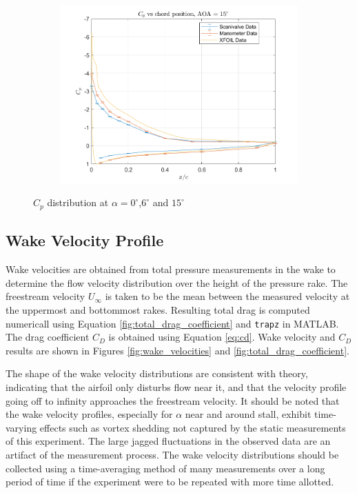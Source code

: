 \documentclass[runningheads]{llncs}
\begin{document}
\begin{figure}[h]
\begin{subfigure}[b]{0.45\textwidth}
         \includegraphics[width=\textwidth]{figures/AOA15.png}
         \caption{}
         \label{fig:cp_6}
     \end{subfigure}
    \caption{$C_p$ distribution at $\alpha = 0^\circ$,$6^\circ$ and $15^\circ$}
    \label{fig:cp}
\end{figure}


\subsection{Wake Velocity Profile}
Wake velocities are obtained from total pressure measurements in the wake to determine the flow velocity distribution over the height of the pressure rake. The freestream velocity $U_\infty$ is taken to be the mean between the measured velocity at the uppermost and bottommost rakes. Resulting total drag is computed numericall using Equation \ref{fig:total_drag_coefficient} and \verb|trapz| in MATLAB. The drag coefficient $C_D$ is obtained using Equation \ref{eq:cd}. Wake velocity and $C_D$ results are shown in Figures \ref{fig:wake_velocities} and \ref{fig:total_drag_coefficient}.

The shape of the wake velocity distributions are consistent with theory, indicating that the airfoil only disturbs flow near it, and that the velocity profile going off to infinity approaches the freestream velocity. It should be noted that the wake velocity profiles, especially for $\alpha$ near and around stall, exhibit time-varying effects such as vortex shedding not captured by the static measurements of this experiment. The large jagged fluctuations in the observed data are an artifact of the measurement process. The wake velocity distributions should be collected using a time-averaging method of many measurements over a long period of time if the experiment were to be repeated with more time allotted.
\end{document}
